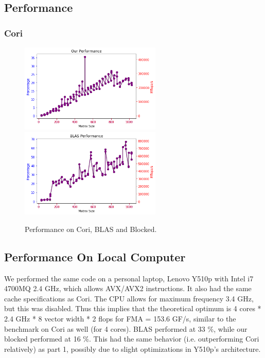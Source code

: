 \documentclass[12pt]{article}
\begin{document}
\subsection{Performance}
\subsubsection{Cori}
\begin{figure}[h]
  \caption{Performance on Cori, BLAS and Blocked.}
  \centering
  \includegraphics[width=0.6\textwidth]{blocked.png}
    \includegraphics[width=0.6\textwidth]{blas.png}
\end{figure}



\subsection{Performance On Local Computer}
We performed the same code on a personal laptop, Lenovo Y510p with Intel i7 4700MQ 2.4 GHz, which allows AVX/AVX2 instructions. It also had the same cache specifications as Cori. The CPU allows for maximum frequency 3.4 GHz, but this was disabled. Thus this implies that the theoretical optimum is 4 cores * 2.4 GHz * 8 vector width * 2 flops for FMA = 153.6 GF/s, similar to the benchmark on Cori as well (for 4 cores). BLAS performed at 33 \%, while our blocked performed at 16 \%. This had the same behavior (i.e. outperforming Cori relatively) as part 1, possibly due to slight optimizations in Y510p's architecture. 
\end{document}
